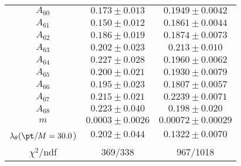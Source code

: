 \begin{tabular}{c|c|c}
$A_60$ & $0.173\pm0.013$ & $0.1949\pm0.0042$ \\
$A_61$ & $0.150\pm0.012$ & $0.1861\pm0.0044$ \\
$A_62$ & $0.186\pm0.019$ & $0.1874\pm0.0073$ \\
$A_63$ & $0.202\pm0.023$ & $0.213\pm0.010$ \\
$A_64$ & $0.227\pm0.028$ & $0.1960\pm0.0062$ \\
$A_65$ & $0.200\pm0.021$ & $0.1930\pm0.0079$ \\
$A_66$ & $0.195\pm0.023$ & $0.1807\pm0.0057$ \\
$A_67$ & $0.215\pm0.021$ & $0.2239\pm0.0071$ \\
$A_68$ & $0.223\pm0.040$ & $0.198\pm0.020$ \\
$m$ & $0.0003\pm0.0026$ & $0.00072\pm0.00029$ \\
$\lambda_\theta(\pt/M = 30.0$) & $0.202\pm0.044$ & $0.1322\pm0.0070$ \\
\hline
$\chi^2$/ndf & 369/338 & 967/1018
\end{tabular}
